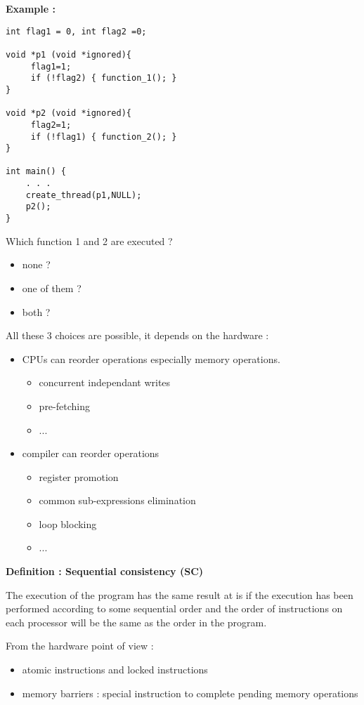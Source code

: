 \documentclass[a4paper,10pt]{article}
\begin{document}
\textbf{Example :}

\begin{verbatim}
int flag1 = 0, int flag2 =0;

void *p1 (void *ignored){
     flag1=1;
     if (!flag2) { function_1(); }
}

void *p2 (void *ignored){
     flag2=1;
     if (!flag1) { function_2(); }
}

int main() {
	. . . 
	create_thread(p1,NULL);
	p2();
}

\end{verbatim}

Which function 1 and 2 are executed ?
\begin{itemize}
\item none ?
\item one of them ?
\item both ?
\end{itemize}

All these 3 choices are possible, it depends on the hardware :
\begin {itemize}
\item CPUs can reorder operations especially memory operations.
\begin{itemize}
\item concurrent independant writes
\item pre-fetching
\item ...
\end{itemize}
\item compiler can reorder operations 
\begin{itemize}
\item register promotion
\item common sub-expressions elimination
\item loop blocking
\item ...
\end{itemize}
\end{itemize}


\textbf{Definition : Sequential consistency (SC)}

The execution of the program has the same result at is if the execution has been performed according to some sequential order and the order of instructions on each processor will be the same as the order in the program.

From the hardware point of view :
\begin{itemize}
\item atomic instructions and locked instructions
\item memory barriers : special instruction to complete pending memory operations
\end{itemize}
\end{document}
